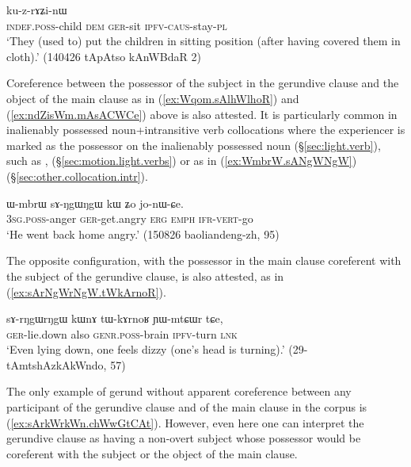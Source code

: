 \begin{exe}
\ex \label{ex:sAmdzWmdzW.kuzrAZinW}
 ku-z-rɤʑi-nɯ \\
\textsc{indef}.\textsc{poss}-child \textsc{dem} \textsc{ger}-sit \textsc{ipfv}-\textsc{caus}-stay-\textsc{pl} \\
\glt `They (used to) put the children in sitting position (after having covered them in cloth).' (140426 tApAtso kAnWBdaR 2)
\end{exe}

Coreference between the possessor of the subject in the gerundive clause and the object of the main clause as in (\ref{ex:Wqom.sAlhWlhoR}) and (\ref{ex:ndZisWm.mAsACWCe}) above is also attested. It is particularly common in inalienably possessed noun+intransitive verb collocations where the experiencer is marked as the possessor on the inalienably possessed noun (§\ref{sec:light.verb}), such as ,  (§\ref{sec:motion.light.verbs}) or  as in (\ref{ex:WmbrW.sANgWNgW}) (§\ref{sec:other.collocation.intr}).

\begin{exe}
\ex \label{ex:WmbrW.sANgWNgW}
\gll ɯ-mbrɯ sɤ-ŋgɯ\redp{}ŋgɯ kɯ ʑo jo-nɯ-ɕe. \\
\textsc{3sg}.\textsc{poss}-anger \textsc{ger}-get.angry \textsc{erg} \textsc{emph} \textsc{ifr}-\textsc{vert}-go \\
\glt `He went back home angry.' (150826 baoliandeng-zh, 95)
\end{exe}

The opposite configuration, with the possessor in the main clause coreferent with the subject of the gerundive clause, is also attested, as in (\ref{ex:sArNgWrNgW.tWkArnoR}).

\begin{exe}
\ex \label{ex:sArNgWrNgW.tWkArnoR}
\gll  sɤ-rŋgɯ\redp{}rŋgɯ kɯnɤ tɯ-kɤrnoʁ ɲɯ-mtɕɯr tɕe, \\
\textsc{ger}-lie.down also \textsc{genr}.\textsc{poss}-brain \textsc{ipfv}-turn \textsc{lnk} \\
\glt `Even lying down, one feels dizzy (one's head is turning).' (29-tAmtshAzkAkWndo, 57)
\end{exe}

The only example of gerund without apparent coreference between any participant of the gerundive clause and of the main clause in the corpus is (\ref{ex:sArkWrkWn.chWwGtCAt}). However, even here one can interpret the gerundive clause as having a non-overt subject whose possessor would be coreferent with the subject or the object of the main clause.

